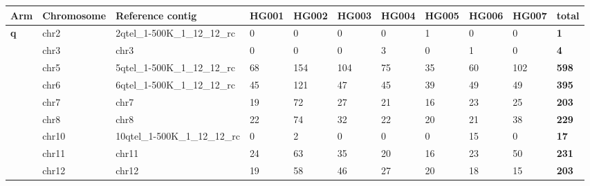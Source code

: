 \begin{samepage} \begin{table}[h!] \small \begin{tabular}{lllllllllll}
\hline
\textbf{Arm}   & \textbf{Chromosome} & \textbf{Reference contig}       & \textbf{HG001} & \textbf{HG002} & \textbf{HG003} & \textbf{HG004} & \textbf{HG005} & \textbf{HG006} & \textbf{HG007} & \textbf{total} \\
\hline
\textbf{q}     & chr2                & 2qtel\_1-500K\_1\_12\_12\_rc    & 0              & 0              & 0              & 0              & 1              & 0              & 0              & \textbf{1}     \\
\textbf{}      & chr3                & chr3                            & 0              & 0              & 0              & 3              & 0              & 1              & 0              & \textbf{4}     \\
\textbf{}      & chr5                & 5qtel\_1-500K\_1\_12\_12\_rc    & 68             & 154            & 104            & 75             & 35             & 60             & 102            & \textbf{598}   \\
\textbf{}      & chr6                & 6qtel\_1-500K\_1\_12\_12\_rc    & 45             & 121            & 47             & 45             & 39             & 49             & 49             & \textbf{395}   \\
\textbf{}      & chr7                & chr7                            & 19             & 72             & 27             & 21             & 16             & 23             & 25             & \textbf{203}   \\
\textbf{}      & chr8                & chr8                            & 22             & 74             & 32             & 22             & 20             & 21             & 38             & \textbf{229}   \\
\textbf{}      & chr10               & 10qtel\_1-500K\_1\_12\_12\_rc   & 0              & 2              & 0              & 0              & 0              & 15             & 0              & \textbf{17}    \\
\textbf{}      & chr11               & chr11                           & 24             & 63             & 35             & 20             & 16             & 23             & 50             & \textbf{231}   \\
\textbf{}      & chr12               & chr12                           & 19             & 58             & 46             & 27             & 20             & 18             & 15             & \textbf{203}   \\

\end{tabular}
\end{table}
\end{samepage}
